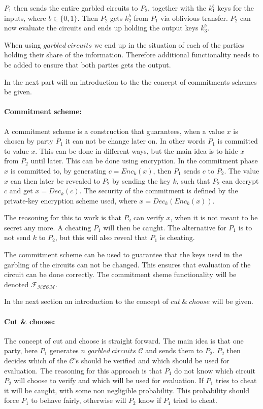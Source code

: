 \documentclass[twoside,11pt,openright]{report}
\begin{document}
$P_1$ then sends the entire garbled circuits to $P_2$, together with the $k^b_1$ keys for the inputs, where $b\in\{0,1\}$. Then $P_2$ gets $k^b_2$ from $P_1$ via oblivious transfer. $P_2$ can now evaluate the circuits and ends up holding the output keys $k^b_3$.

When using $garbled~circuits$ we end up in the situation of each of the parties holding their share of the information. Therefore additional functionality needs to be added to ensure that both parties gets the output.

\bigskip

In the next part will an introduction to the the concept of commitments schemes be given.

\paragraph{Commitment scheme:}
A commitment scheme is a construction that guarantees, when a value $x$ is chosen by party $P_1$ it can not be change later on. In other words $P_1$ is committed to value $x$. This can be done in different ways, but the main idea is to hide $x$ from $P_2$ until later. This can be done using encryption. In the commitment phase $x$ is committed to, by generating $c=Enc_k(x)$, then $P_1$ sends $c$ to $P_2$. The value $x$ can then later be revealed to $P_2$ by sending the key $k$, such that $P_2$ can decrypt $c$ and get $x=Dec_k(c)$. The security of the commitment is defined by the private-key encryption scheme used, where $x=Dec_k(Enc_k(x))$.

The reasoning for this to work is that $P_2$ can verify $x$, when it is not meant to be secret any more. A cheating $P_1$ will then be caught. The alternative for $P_1$ is to not send $k$ to $P_2$, but this will also reveal that $P_1$ is cheating. 

The commitment scheme can be used to guarantee that the keys used in the garbling of the circuits can not be changed. This ensures that evaluation of the circuit can be done correctly. The commitment sheme functionality will be denoted $\mathcal{F_{HCOM}}$.

\bigskip

In the next section an introduction to the concept of $cut~\&~choose$ will be given.

\paragraph{Cut \& choose:}
The concept of cut and choose is straight forward. The main idea is that one party, here $P_1$ generates $n$ $garbled~circuits$ $\mathcal{C}$ and sends them to $P_2$. $P_2$ then decides which of the $\mathcal{C}$'s should be verified and which should be used for evaluation. The reasoning for this approach is that $P_1$ do not know which circuit $P_2$ will choose to verify and which will be used for evaluation. If $P_1$ tries to cheat it will be caught, with some non negligible probability. This probability should force $P_1$ to behave fairly, otherwise will $P_2$ know if $P_1$ tried to cheat.
\end{document}
